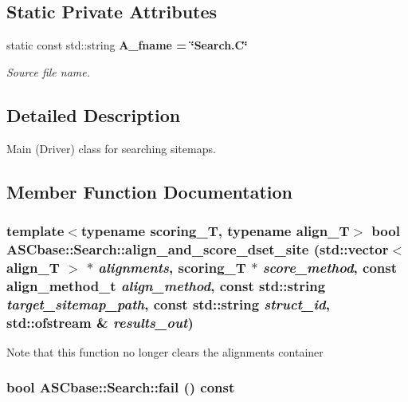 \subsection*{Static Private Attributes}
\begin{CompactItemize}
\item 
static const std::string \bf{A\_\-fname} = \char`\"{}Search.C\char`\"{}\label{classASCbase_1_1Search_f7e20ddc101c1e6165e3b00a2e0eeb82}

\begin{CompactList}\small\item\em Source file name. \item\end{CompactList}\end{CompactItemize}


\subsection{Detailed Description}
Main (Driver) class for searching sitemaps. 



\subsection{Member Function Documentation}
\subsubsection{\setlength{\rightskip}{0pt plus 5cm}template$<$typename scoring\_\-T, typename align\_\-T$>$ bool ASCbase::Search::align\_\-and\_\-score\_\-dset\_\-site (std::vector$<$ align\_\-T $>$ $\ast$ {\em alignments}, scoring\_\-T $\ast$ {\em score\_\-method}, const align\_\-method\_\-t {\em align\_\-method}, const std::string {\em target\_\-sitemap\_\-path}, const std::string {\em struct\_\-id}, std::ofstream \& {\em results\_\-out})\hspace{0.3cm}{\tt  [inline, private]}}\label{classASCbase_1_1Search_fd59641ac1b15dd60260cdc03455068d}


Note that this function no longer clears the alignments container 
\subsubsection{\setlength{\rightskip}{0pt plus 5cm}bool ASCbase::Search::fail () const\hspace{0.3cm}{\tt  [inline]}}\label{classASCbase_1_1Search_829f1f284ce32f03af0d34bdf6ccfab4}


